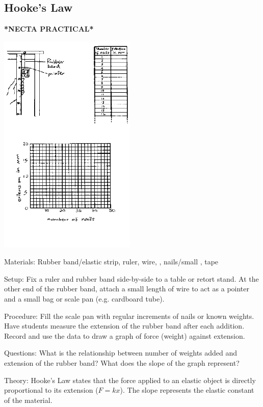 \begin{multicols}{2}
\subsection{Hooke's Law}  
\textbf{*NECTA PRACTICAL*}
\begin{center}
\includegraphics[width=0.49\textwidth]{./img/source/meas-mass.png}
\end{center}

\begin{description*}
\item[Materials:]{Rubber band/elastic strip, ruler, wire, , nails/small , tape}
\item[Setup:]{Fix a ruler and rubber band side-by-side to a table or retort stand. At the other end of the rubber band, attach a small length of wire to act as a pointer and a small bag or scale pan (e.g. cardboard tube).}
\item[Procedure:]{Fill the scale pan with regular increments of nails or known weights. Have students measure the extension of the rubber band after each addition. Record and use the data to draw a graph of force (weight) against extension.}
\item[Questions:]{What is the relationship between number of weights added and extension of the rubber band? What does the slope of the graph represent?}
\item[Theory:]{Hooke's Law states that the force applied to an elastic object is directly proportional to its extension ($F = kx$). The slope represents the elastic constant of the material. }
\end{description*}


\end{multicols}
